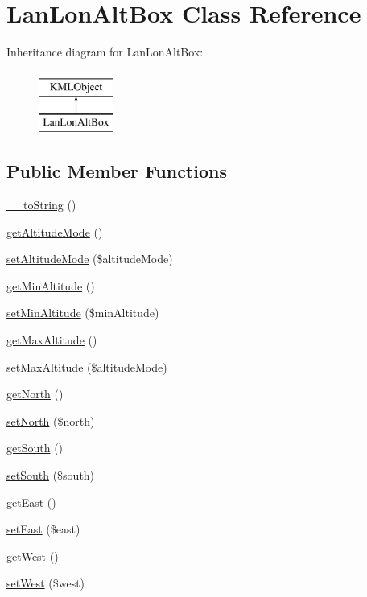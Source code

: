 \hypertarget{classLanLonAltBox}{
\section{LanLonAltBox Class Reference}
\label{d4/d1a/classLanLonAltBox}
}
Inheritance diagram for LanLonAltBox:\begin{figure}[H]
\begin{center}
\leavevmode
\includegraphics[height=2.000000cm]{d4/d1a/classLanLonAltBox}
\end{center}
\end{figure}
\subsection*{Public Member Functions}
\begin{DoxyCompactItemize}
\item 
\hyperlink{classLanLonAltBox_a112ac7b58e73d5ff6c62217f938e6294}{\_\-\_\-toString} ()
\item 
\hyperlink{classLanLonAltBox_a08442b2d73fea73e5ad6cc8b6e49923b}{getAltitudeMode} ()
\item 
\hyperlink{classLanLonAltBox_a1e53ed60cfc6a7107cd56198eebf8578}{setAltitudeMode} (\$altitudeMode)
\item 
\hyperlink{classLanLonAltBox_abf76d1c0bd264999bcfa203d368a57f4}{getMinAltitude} ()
\item 
\hyperlink{classLanLonAltBox_a9d69d3237ee3ff9cd276617024060550}{setMinAltitude} (\$minAltitude)
\item 
\hyperlink{classLanLonAltBox_a8c7e45d30c3ff244906dad5a721d9617}{getMaxAltitude} ()
\item 
\hyperlink{classLanLonAltBox_adc6f53640f72daf2226ceafb85fa064c}{setMaxAltitude} (\$altitudeMode)
\item 
\hyperlink{classLanLonAltBox_ac052f63524c36af6b05984f3ae00f30e}{getNorth} ()
\item 
\hyperlink{classLanLonAltBox_a3764d5a60f7d5a07116553d1488a1c32}{setNorth} (\$north)
\item 
\hyperlink{classLanLonAltBox_a44234b6275dc54b411940c4ed9a962ac}{getSouth} ()
\item 
\hyperlink{classLanLonAltBox_a9fe6b5a21098a4f669b45f7a7ce84d31}{setSouth} (\$south)
\item 
\hyperlink{classLanLonAltBox_af5109898b0803f13c743c0e574a66eb5}{getEast} ()
\item 
\hyperlink{classLanLonAltBox_a4454cf8ec3aef6b019e82b4149831029}{setEast} (\$east)
\item 
\hyperlink{classLanLonAltBox_a797fed47d83811279369db8cd0e2ec92}{getWest} ()
\item 
\hyperlink{classLanLonAltBox_a02968e8c9417b7fe970d9764117081cf}{setWest} (\$west)
\end{DoxyCompactItemize}


